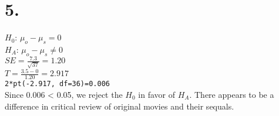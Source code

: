 \documentclass{article}
\begin{document}
\section*{5.}
$H_0$: $\mu_o - \mu_s = 0$\\
$H_A$: $\mu_o - \mu_s \neq 0$\\
$SE = \frac{7.3}{\sqrt{37}} = 1.20$\\
$T = \frac{3.5-0}{1.20} = 2.917$\\
\texttt{2*pt(-2.917, df=36)=0.006}\\
Since 0.006 < 0.05, we reject the $H_0$ in favor of $H_A$. There appears to be a
difference in critical review of original movies and their sequals.
\end{document}
